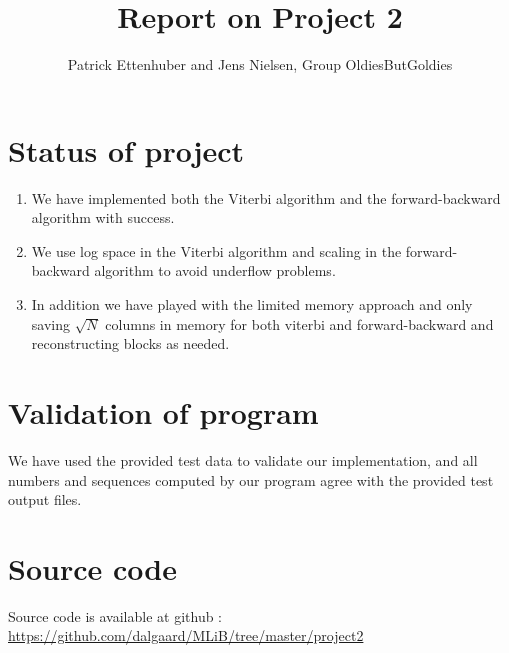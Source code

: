 \documentclass[11pt]{article}
\title{Report on Project 2}
\author{Patrick Ettenhuber and Jens Nielsen, Group OldiesButGoldies}
\begin{document}
\maketitle

\section*{Status of project}

\begin{enumerate}
\item We have implemented both the Viterbi algorithm and the
  forward\--backward algorithm with success.
\item We use log space in the Viterbi algorithm and scaling in the
  forward\--backward algorithm to avoid underflow problems.
\item In addition we have played with the limited memory approach and
  only saving $\sqrt{N}$ columns in memory for both viterbi and
  forward\--backward and reconstructing blocks as needed.
\end{enumerate}

\section*{Validation of program}

We have used the provided test data to
validate our implementation, and all numbers and sequences computed by
our program agree with the provided test output files.

\section*{Source code}

Source code is available at github : \url{https://github.com/dalgaard/MLiB/tree/master/project2}
\end{document}
